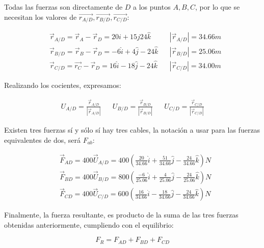 Todas las fuerzas son directamente de $D$ a los puntos $A,B,C$, por lo que se necesitan los valores de $\overrightarrow{r_{A/D}},\overrightarrow{r_{B/D}},\overrightarrow{r_{C/D}}$:

\begin{align*}
	 & \overrightarrow{r}_{A/D}=\overrightarrow{r}_A-\overrightarrow{r}_{D}=20i+15j24\hat{k}              &  & \left\lvert \overrightarrow{r}_{A/D} \right\rvert=34.66m \\
	 & \overrightarrow{r}_{B/D}=\overrightarrow{r}_B-\overrightarrow{r}_{D}=-6\hat{i}+4\hat{j}-24\hat{k}  &  & \left\lvert \overrightarrow{r}_{B/D} \right\rvert=25.06m \\
	 & \overrightarrow{r}_{C/D}=\overrightarrow{r_C}-\overrightarrow{r}_{D}=16\hat{i}-18\hat{j}-24\hat{k} &  & \left\lvert \overrightarrow{r}_{C/D} \right\rvert=34.00m
\end{align*}

Realizando los cocientes, expresamos:

\begin{align*}
	U_{A/D}=\frac{\overrightarrow{r}_{A/D}}{\left\lvert \overrightarrow{r}_{A/D} \right\rvert} &  & U_{B/D}=\frac{\overrightarrow{r}_{B/D}}{\left\lvert \overrightarrow{r}_{B/D} \right\rvert} &  & U_{C/D}=\frac{\overrightarrow{r}_{C/D}}{\left\lvert \overrightarrow{r}_{C/D} \right\rvert}
\end{align*}

Existen tres fuerzas sí y sólo sí hay tres cables, la notación a usar para las fuerzas equivalentes de dos, será $F_{ab}$:

\begin{align*}
	 & \overrightarrow{F}_{AD}=400\overrightarrow{U}_{A/D}=400\left(\frac{20}{34.66}\hat{i}+\frac{51}{34.66}\hat{j}-\frac{24}{34.66}\hat{k}\right)N \\
	 & \overrightarrow{F}_{BD}=400\overrightarrow{U}_{B/D}=800\left(\frac{-6}{25.06}\hat{i}+\frac{4}{25.06}\hat{j}-\frac{24}{25.06}\hat{k}\right)N  \\
	 & \overrightarrow{F}_{CD}=400\overrightarrow{U}_{C/D}=600\left(\frac{16}{34.66}\hat{i}-\frac{18}{34.66}\hat{j}-\frac{24}{34.66}\hat{k}\right)N
\end{align*}

Finalmente, la fuerza resultante, es producto de la suma de las tres fuerzas obtenidas anteriormente, cumpliendo con el equilibrio:

\begin{equation}
	F_R=F_{AD}+F_{BD}+F_{CD}
\end{equation}

